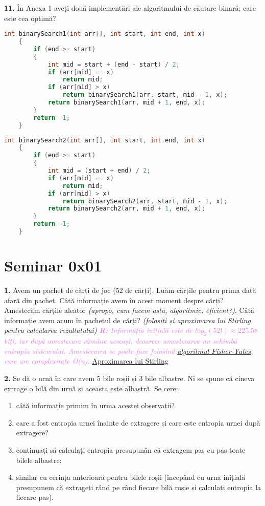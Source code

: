 \documentclass[a4paper]{article}
\newcommand{\hl}[1]{\textcolor{violet}{\textit{#1}}}
\begin{document}
\textbf{11.} În Anexa 1 aveți două implementări ale algoritmului de căutare binară; care este cea optimă?
\begin{multicols}{2}
    \begin{lstlisting}[language=C++]
    int binarySearch1(int arr[], int start, int end, int x)
    {
        if (end >= start)
        {
            int mid = start + (end - start) / 2;
            if (arr[mid] == x)
                return mid;
            if (arr[mid] > x)
                return binarySearch1(arr, start, mid - 1, x);
            return binarySearch1(arr, mid + 1, end, x);
        }
        return -1;
    }
    \end{lstlisting}
    \begin{lstlisting}[language=C++]
    int binarySearch2(int arr[], int start, int end, int x)
    {
        if (end >= start)
        {
            int mid = (start + end) / 2;
            if (arr[mid] == x)
                return mid;
            if (arr[mid] > x)
                return binarySearch2(arr, start, mid - 1, x);
            return binarySearch2(arr, mid + 1, end, x);
        }
        return -1;
    }
    \end{lstlisting}
\end{multicols}
\vspace{0.5cm}

\section{Seminar 0x01}
\textbf{1.} Avem un pachet de cărți de joc (52 de cărți). Luăm cărțile pentru prima dată afară din pachet. Câtă informație avem în acest moment despre cărți? Amestecăm cărțile aleator \textit{(apropo, cum facem asta, algoritmic, eficient?)}. Câtă informație avem acum în pachetul de cărți? \textit{(folosiți și aproximarea lui Stirling pentru calcularea rezultatului)}
\vspace{0.35cm}
\noindent \hl{\textbf{R:} Informația inițială este de $log_2(52!) \approx 225.58$ biți, iar după amestecare rămâne aceeași, deoarece amestecarea nu schimbă entropia sistemului. Amestecarea se poate face folosind \href{https://en.wikipedia.org/wiki/Fisher\%E2\%80\%93Yates_shuffle}{algoritmul Fisher-Yates}, care are complexitate O(n).}
\href{https://en.wikipedia.org/wiki/Stirling\%27s_approximation}{Aproximarea lui Stirling}

\textbf{2.} Se dă o urnă în care avem 5 bile roșii și 3 bile albastre. Ni se spune că cineva extrage o bilă din urnă și aceasta este albastră. Se cere:
\begin{enumerate}[label=(\alph*)]
    \item câtă informație primim în urma acestei observații?
    \item care a fost entropia urnei înainte de extragere și care este entropia urnei după extragere?
    \item continuați să calculați entropia presupunân că extragem pas cu pas toate bilele albastre;
    \item similar cu cerința anterioară pentru bilele roșii (începând cu urna inițială presupunem că extrageți rând pe rând fiecare bilă roșie și calculați entropia la fiecare pas).
\end{enumerate}
\end{document}
